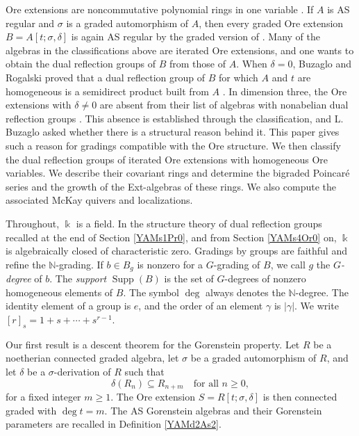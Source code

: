 \documentclass[reqno]{amsart}
\numberwithin{equation}{section}
\theoremstyle{definition}
\theoremstyle{remark}
\theoremstyle{plain}
\newcommand{\kk}{\Bbbk}
\DeclareMathOperator{\supp}{Supp}
\begin{document}
Ore extensions are noncommutative polynomial rings in one variable \cite{Ore}. If $A$ is AS regular and $\sigma$ is a graded automorphism of $A$, then every graded Ore extension $B=A[t;\sigma,\delta]$ is again AS regular by the graded version of \cite[Theorem 3.3]{LWW}. Many of the algebras in the classifications above are iterated Ore extensions, and one wants to obtain the dual reflection groups of $B$ from those of $A$. When $\delta=0$, Buzaglo and Rogalski proved that a dual reflection group of $B$ for which $A$ and $t$ are homogeneous is a semidirect product built from $A$ \cite[Proposition 6.1]{BR}. In dimension three, the Ore extensions with $\delta\neq0$ are absent from their list of algebras with nonabelian dual reflection groups \cite[Theorem 1.2]{BR}. This absence is established through the classification, and L. Buzaglo asked whether there is a structural reason behind it. This paper gives such a reason for gradings compatible with the Ore structure. We then classify the dual reflection groups of iterated Ore extensions with homogeneous Ore variables. We describe their covariant rings and determine the bigraded Poincar\'e series and the growth of the Ext-algebras of these rings. We also compute the associated McKay quivers and localizations.

Throughout, $\kk$ is a field. In the structure theory of dual reflection groups recalled at the end of Section \ref{YAMs1Pr0}, and from Section \ref{YAMs4Or0} on, $\kk$ is algebraically closed of characteristic zero. Gradings by groups are faithful and refine the $\mathbb N$-grading. If $b\in B_g$ is nonzero for a $G$-grading of $B$, we call $g$ the \emph{$G$-degree} of $b$. The \emph{support} $\supp(B)$ is the set of $G$-degrees of nonzero homogeneous elements of $B$. The symbol $\deg$ always denotes the $\mathbb N$-degree. The identity element of a group is $e$, and the order of an element $\gamma$ is $|\gamma|$. We write $[r]_s=1+s+\cdots+s^{r-1}$.

Our first result is a descent theorem for the Gorenstein property. Let $R$ be a noetherian connected graded algebra, let $\sigma$ be a graded automorphism of $R$, and let $\delta$ be a $\sigma$-derivation of $R$ such that
\begin{equation}\label{YAMq5Ef7}
\delta(R_n)\subseteq R_{n+m}\quad\text{for all }n\ge0,
\end{equation}
for a fixed integer $m\ge1$. The Ore extension $S=R[t;\sigma,\delta]$ is then connected graded with $\deg t=m$. The AS Gorenstein algebras and their Gorenstein parameters are recalled in Definition \ref{YAMd2As2}.
\end{document}
